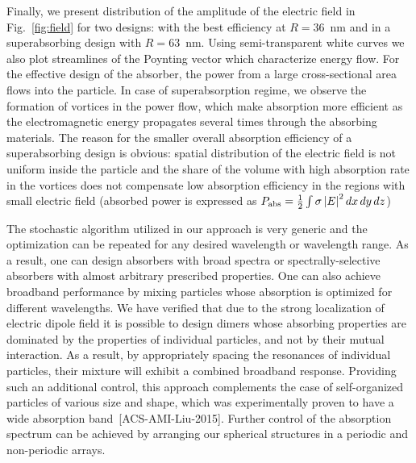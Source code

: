 \documentclass[twoside,twocolumn,9pt]{article}
\begin{document}
\begin{figure}[h]
\end{figure}
Finally, we present distribution of the amplitude of the electric
field in Fig.~\ref{fig:field} for two designs: with the best
efficiency at $R=36$~nm and in a superabsorbing design with $R=63$~nm.
Using semi-transparent white curves we also plot streamlines of the
Poynting vector which characterize energy flow.  For the effective
design of the absorber, the power from a large cross-sectional area
flows into the particle.  In case of superabsorption regime, we
observe the formation of vortices in the power flow, which make
absorption more efficient as the electromagnetic energy propagates
several times through the absorbing materials.  The reason for the
smaller overall absorption efficiency of a superabsorbing design is
obvious: spatial distribution of the electric field is not uniform
inside the particle and the share of the volume with high absorption
rate in the vortices does not compensate low absorption efficiency in
the regions with small electric field (absorbed power is expressed as
$P_{\rm abs}=\frac{1}{2}\int\sigma \left|E\right|^2dx\,dy\,dz$)

The stochastic algorithm utilized in our approach is very generic and
the optimization can be repeated for any desired wavelength or
wavelength range.  As a result, one can design absorbers with broad
spectra or spectrally-selective absorbers with almost arbitrary
prescribed properties.  One can also achieve broadband performance by
mixing particles whose absorption is optimized for different
wavelengths. We have verified that due to the strong localization of
electric dipole field it is possible to design dimers whose absorbing
properties are dominated by the properties of individual particles,
and not by their mutual interaction. As a result, by appropriately
spacing the resonances of individual particles, their mixture will
exhibit a combined broadband response. Providing such an additional
control, this approach complements the case of self-organized
particles of various size and shape, which was experimentally proven
to have a wide absorption band~[ACS-AMI-Liu-2015]. %
Further control of the absorption spectrum can be achieved by
arranging our spherical structures in a periodic and non-periodic
arrays.
\end{document}
